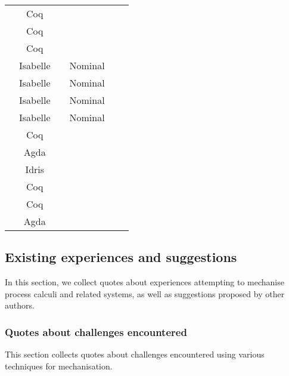\begin{tabular}{l|c|c|c|c|l}
  \cite{Hirsch2022}                  & Coq                    &           &         &             &             \\
  \cite{Cruz-Filipe2021b}            & Coq                    &           &         &             &             \\
  \cite{Maksimovic2015}              & Coq                    &           &         &             &             \\
  \cite{Parrow2014}                  & Isabelle               &           & Nominal &             &             \\
  \cite{Bengtson2016}                & Isabelle               &           & Nominal &             &             \\
  \cite{Kahsai2008}                  & Isabelle               &           & Nominal &             &             \\
  \cite{Bengtson2007}                & Isabelle               &           & Nominal &             &             \\
  \cite{Castro-Perez2021}            & Coq                    &           &         &             &             \\
  \cite{Gay2020}                     & Agda                   &           &         &             &             \\
  \cite{Brady2017}                   & Idris                  &           &         &             &             \\
  \cite{Hinrichsen2019}              & Coq                    &           &         &             &             \\
  \cite{Sergey2017}                  & Coq                    &           &         &             &             \\
  \cite{DBLP:conf/forte/ZalakainD21} & Agda                   &           &         &             & 
\end{tabular}

\subsection{Existing experiences and suggestions}
In this section, we collect quotes about experiences attempting to mechanise process calculi and related systems, as well as suggestions proposed by other authors.

\subsubsection{Quotes about challenges encountered}
This section collects quotes about challenges encountered using various techniques for mechanisation.

